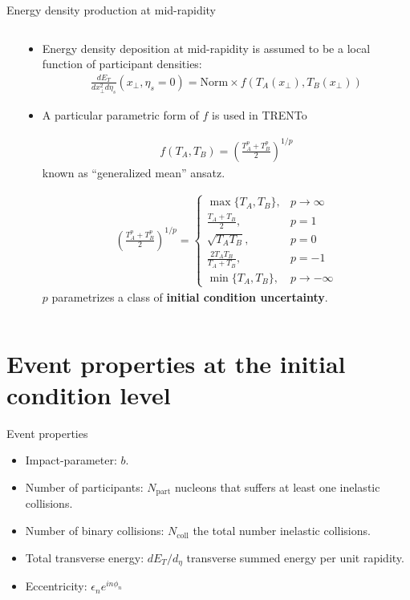 \documentclass[11pt, aspectratio=169]{beamer}
\begin{document}
\begin{frame}{Energy density production at mid-rapidity}
\begin{columns}
\begin{column}{.35\textwidth}
\end{column}
\begin{column}{.7\textwidth}
\begin{itemize}
\item Energy density deposition at mid-rapidity is assumed to be a local function of participant densities:
\begin{eqnarray}
\nonumber
\frac{d E_T}{dx_\perp^2 d\eta_s}(x_\perp, \eta_s=0) = \textrm{Norm}\times f(T_A(x_\perp), T_B(x_\perp))
\end{eqnarray}
\item A particular parametric form of $f$ is used in TRENTo
\begin{overprint}
\begin{eqnarray}
\nonumber
f(T_A, T_B) = \left(\frac{T_A^p+T_B^p}{2}\right)^{1/p}
\end{eqnarray}
known as ``generalized mean'' ansatz.

\vspace{-1em}
\begin{eqnarray}
\nonumber
\left(\frac{T_A^p+T_B^p}{2}\right)^{1/p} = 
\begin{cases}
\max\{T_A, T_B\}, & p\rightarrow \infty \\
\frac{T_A+T_B}{2}, & p=1 \\
\sqrt{T_A T_B}, & p=0\\
\frac{2T_A T_B}{T_A+T_B}, & p=-1\\
\min\{T_A, T_B\}, & p\rightarrow - \infty
\end{cases}
\end{eqnarray}
$p$ parametrizes a class of {\bf initial condition uncertainty}.
\end{overprint}
\end{itemize}

\end{column}
\end{columns}
\end{frame}

\section{Event properties at the initial condition level}
\begin{frame}{Event properties}
\begin{itemize}
\item Impact-parameter: $b$.
\item Number of participants: $N_{\textrm{part}}$ nucleons that suffers at least one inelastic collisions.
\item Number of binary collisions: $N_{\textrm{coll}}$ the total number inelastic collisions.
\item Total transverse energy: $dE_T/d_\eta$ transverse summed energy per unit rapidity.
\item Eccentricity: $\epsilon_n e^{in\phi_n}$
\end{itemize}
\end{frame}
\end{document}

